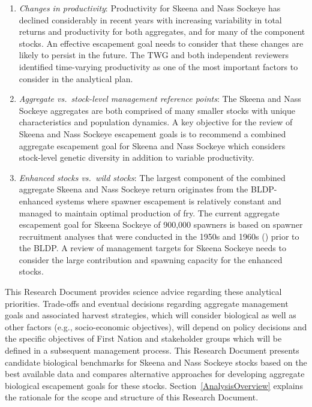 \documentclass[french,11pt]{book}
\begin{document}
\begin{itemize}
\begin{enumerate}
  \item
    \emph{Changes in productivity}: Productivity for Skeena and Nass Sockeye has declined considerably in recent years with increasing variability in total returns and productivity for both aggregates, and for many of the component stocks. An effective escapement goal needs to consider that these changes are likely to persist in the future. The TWG and both independent reviewers identified time-varying productivity as one of the most important factors to consider in the analytical plan.
  \item
    \emph{Aggregate vs.~stock-level management reference points}: The Skeena and Nass Sockeye aggregates are both comprised of many smaller stocks with unique characteristics and population dynamics. A key objective for the review of Skeena and Nass Sockeye escapement goals is to recommend a combined aggregate escapement goal for Skeena and Nass Sockeye which considers stock-level genetic diversity in addition to variable productivity.
  \item
    \emph{Enhanced stocks vs.~wild stocks}: The largest component of the combined aggregate Skeena and Nass Sockeye return originates from the BLDP-enhanced systems where spawner escapement is relatively constant and managed to maintain optimal production of fry. The current aggregate escapement goal for Skeena Sockeye of 900,000 spawners is based on spawner recruitment analyses that were conducted in the 1950s and 1960s () prior to the BLDP. A review of management targets for Skeena Sockeye needs to consider the large contribution and spawning capacity for the enhanced stocks.
  \end{enumerate}
\end{itemize}
This Research Document provides science advice regarding these analytical priorities. Trade-offs and eventual decisions regarding aggregate management goals and associated harvest strategies, which will consider biological as well as other factors (e.g., socio-economic objectives), will depend on policy decisions and the specific objectives of First Nation and stakeholder groups which will be defined in a subsequent management process. This Research Document presents candidate biological benchmarks for Skeena and Nass Sockeye stocks based on the best available data and compares alternative approaches for developing aggregate biological escapement goals for these stocks. Section~\ref{AnalysisOverview} explains the rationale for the scope and structure of this Research Document.
\end{document}
